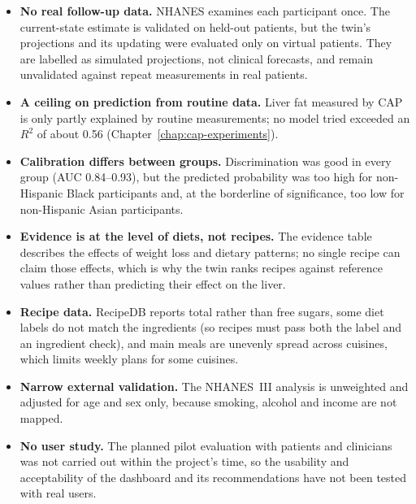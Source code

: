 \begin{itemize}
    \item \textbf{No real follow-up data.} NHANES examines each participant
          once. The current-state estimate is validated on held-out patients,
          but the twin's projections and its updating were evaluated only on
          virtual patients. They are labelled as simulated projections, not
          clinical forecasts, and remain unvalidated against repeat
          measurements in real patients.
    \item \textbf{A ceiling on prediction from routine data.} Liver fat
          measured by CAP is only partly explained by routine measurements;
          no model tried exceeded an $R^2$ of about 0.56
          (Chapter~\ref{chap:cap-experiments}).
    \item \textbf{Calibration differs between groups.} Discrimination was good
          in every group (AUC 0.84--0.93), but the predicted probability was
          too high for non-Hispanic Black participants and, at the borderline
          of significance, too low for non-Hispanic Asian participants.
    \item \textbf{Evidence is at the level of diets, not recipes.} The
          evidence table describes the effects of weight loss and dietary
          patterns; no single recipe can claim those effects, which is why the
          twin ranks recipes against reference values rather than predicting
          their effect on the liver.
    \item \textbf{Recipe data.} RecipeDB reports total rather than free sugars,
          some diet labels do not match the ingredients (so recipes must pass
          both the label and an ingredient check), and main meals are unevenly
          spread across cuisines, which limits weekly plans for some cuisines.
    \item \textbf{Narrow external validation.} The NHANES~III analysis is
          unweighted and adjusted for age and sex only, because smoking,
          alcohol and income are not mapped.
    \item \textbf{No user study.} The planned pilot evaluation with patients
          and clinicians was not carried out within the project's time, so the
          usability and acceptability of the dashboard and its recommendations
          have not been tested with real users.
\end{itemize}

